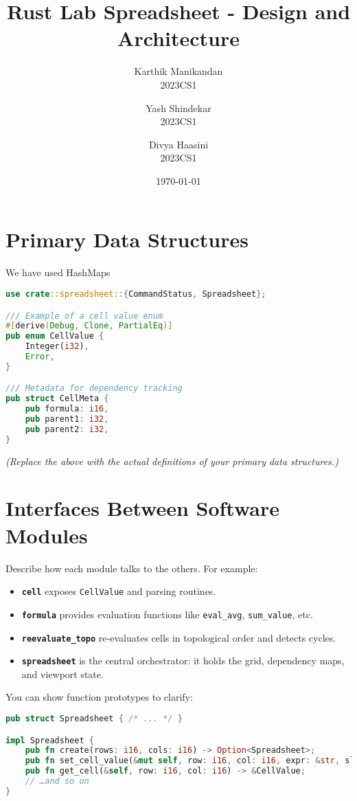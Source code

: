 \documentclass[11pt,a4paper]{article}
\title{Rust Lab Spreadsheet - Design and Architecture}
\author{
  Karthik Manikandan\\ 2023CS1
  \and
  Yash Shindekar \\ 2023CS1
  \and
  Divya Haasini \\2023CS1
}
\date{\today}
\begin{document}
\maketitle
\tableofcontents
\newpage

\section{Primary Data Structures}
\label{sec:data-structures}  

We have used HashMaps

\begin{lstlisting}[language=Rust, caption={Key spreadsheet types}, label=lst:types]
use crate::spreadsheet::{CommandStatus, Spreadsheet};

/// Example of a cell value enum
#[derive(Debug, Clone, PartialEq)]
pub enum CellValue {
    Integer(i32),
    Error,
}

/// Metadata for dependency tracking
pub struct CellMeta {
    pub formula: i16,
    pub parent1: i32,
    pub parent2: i32,
}
\end{lstlisting}

\emph{(Replace the above with the actual definitions of your primary data structures.)}

\section{Interfaces Between Software Modules}
\label{sec:interfaces}

Describe how each module talks to the others. For example:

\begin{itemize}
  \item \textbf{\texttt{cell}} exposes \lstinline{CellValue} and parsing routines.
  \item \textbf{\texttt{formula}} provides evaluation functions like \lstinline{eval_avg}, \lstinline{sum_value}, etc.
  \item \textbf{\texttt{reevaluate_topo}} re‑evaluates cells in topological order and detects cycles.
  \item \textbf{\texttt{spreadsheet}} is the central orchestrator: it holds the grid, dependency maps, and viewport state.
\end{itemize}

You can show function prototypes to clarify:

\begin{lstlisting}[language=Rust, caption={Spreadsheet façade}, label=lst:spreadsheet-api]
pub struct Spreadsheet { /* ... */ }

impl Spreadsheet {
    pub fn create(rows: i16, cols: i16) -> Option<Spreadsheet>;
    pub fn set_cell_value(&mut self, row: i16, col: i16, expr: &str, sleep: &mut f64) -> CommandStatus;
    pub fn get_cell(&self, row: i16, col: i16) -> &CellValue;
    // …and so on
}
\end{lstlisting}
\end{document}
